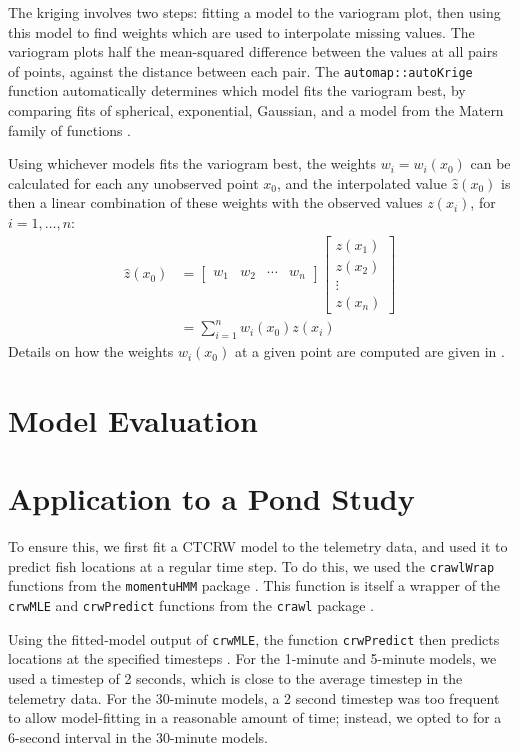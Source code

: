 \documentclass[12pt]{article}
\begin{document}
	The kriging involves two steps: fitting a model to the variogram plot, then using this model to find weights which are used to interpolate missing values. The variogram plots half the mean-squared difference between the values at all pairs of points, against the distance between each pair. The \texttt{automap::autoKrige} function automatically determines which model fits the variogram best, by comparing fits of spherical, exponential, Gaussian, and a model from the Matern family of functions \cite{Hiemstra2008}. 
	
	Using whichever models fits the variogram best, the weights $w_i = w_i(x_0)$ can be calculated for each any unobserved point $x_0$, and the interpolated value $\hat z(x_0)$ is then a linear combination of these weights with the observed values $z(x_i)$, for $i = 1, \ldots, n$:
	\begin{align*}
		\hat z(x_0) &= \begin{bmatrix} w_1 & w_2 & \cdots & w_n \end{bmatrix} \begin{bmatrix} z(x_1) \\ z(x_2) \\ \vdots \\ z(x_n) \end{bmatrix} \\
		&= \sum_{i = 1}^n w_i(x_0) z(x_i)
	\end{align*}
	Details on how the weights $w_i(x_0)$ at a given point are computed are given in \cite{Bailey1995}.
	
	\section{Model Evaluation}
	
	\section{Application to a Pond Study} \label{sec:pond_study}
	
	To ensure this, we first fit a CTCRW model to the telemetry data, and used it to predict fish locations at a regular time step. To do this, we used the \texttt{crawlWrap} functions from the \texttt{momentuHMM} package \cite{McClintock2018}. This function is itself a wrapper of the \texttt{crwMLE} and \texttt{crwPredict} functions from the \texttt{crawl} package \cite{crawl}.
	
	Using the fitted-model output of \texttt{crwMLE}, the function \texttt{crwPredict} then predicts locations at the specified timesteps \cite{crawl, Johnson2008}. For the 1-minute and 5-minute models, we used a timestep of 2 seconds, which is close to the average timestep in the telemetry data. For the 30-minute models, a 2 second timestep was too frequent to allow model-fitting in a reasonable amount of time; instead, we opted to for a 6-second interval in the 30-minute models.
	
\end{document}
